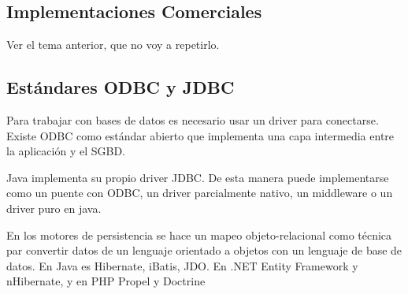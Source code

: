 \subsection{Implementaciones Comerciales}
    Ver el tema anterior, que no voy a repetirlo.

\subsection{Estándares ODBC y JDBC}
        Para trabajar con bases de datos es necesario usar un driver para conectarse. Existe ODBC como estándar abierto que implementa una capa intermedia entre la aplicación y el SGBD.

        Java implementa su propio driver JDBC. De esta manera puede implementarse como un puente con ODBC, un driver parcialmente nativo, un middleware o un driver puro en java.

        En los motores de persistencia se hace un mapeo objeto-relacional como técnica par convertir datos de un lenguaje orientado a objetos con un lenguaje de base de datos. En Java es Hibernate, iBatis, JDO. En .NET Entity Framework y nHibernate, y en PHP Propel y Doctrine
